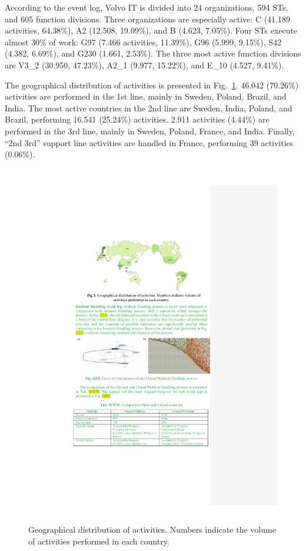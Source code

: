 \documentclass[lnbip]{svmultln}
\begin{document}
According to the event log, Volvo IT is divided into 24 organizations, 594 STs, and 605 function divisions. Three organizations are especially active: C (41.189 activities, 64.38\%), A2 (12.508, 19.09\%), and B (4.623, 7.05\%). Four STs execute almost 30\% of work: G97 (7.466 activities, 11.39\%), G96 (5.999, 9.15\%), S42 (4.382, 6.69\%), and G230 (1.661, 2.53\%). The three most active function divisions are V3\_2 (30.950, 47.23\%), A2\_1 (9.977, 15.22\%), and E\_10 (4.527, 9.41\%).

The geographical distribution of activities is presented in Fig.~\ref{fig:geoActivities}. 46.042 (70.26\%) activities are performed in the 1st line, mainly in Sweden, Poland, Brazil, and India. The most active countries in the 2nd line are Sweden, India, Poland, and Brazil, performing 16.541 (25.24\%) activities. 2.911 activities (4.44\%) are performed in the 3rd line, mainly in Sweden, Poland, France, and India. Finally, ``2nd 3rd'' support line activities are handled in France, performing 39 activities (0.06\%).

\begin{figure}
\centering
\includegraphics[width=\textwidth]{"figs/pic 3"}
\caption{Geographical distribution of activities. Numbers indicate the volume of activities performed in each country.}
\label{fig:geoActivities}
\end{figure}
 
\end{document}
